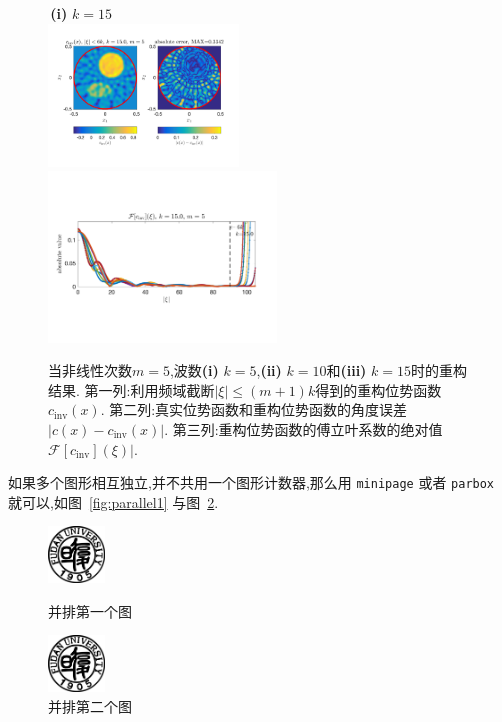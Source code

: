 \documentclass[a4paper,punct=banjiao,twoside]{ctexrep}
\theoremstyle{plain}
\theoremstyle{definition}
\theoremstyle{remark}
\begin{document}
\begin{figure}[H]
\,\hfill \textbf{(i)} $k = 15$ \hfill\,\\
\includegraphics[width=0.45\textwidth,trim=20 60 20 35,clip]{./figs/pwc_5_Ic_0150.png}
\includegraphics[width=0.54\textwidth,trim=10 60 30 90,clip]{./figs/pwc_5_Fc_0150.png}\\
\caption[算法2:不连续位势的重构结果]{当非线性次数$m=5$,波数\textbf{(i)} $k = 5$,\textbf{(ii)} $k = 10$和\textbf{(iii)} $k = 15$时的重构结果.
第一列:利用频域截断$|\xi| \leq (m+1)k$得到的重构位势函数$c_{\textrm{inv}}(x)$.
第二列:真实位势函数和重构位势函数的角度误差$|c(x) - c_{\textrm{inv}}(x)|$.
第三列:重构位势函数的傅立叶系数的绝对值$\mathcal{F}[c_{\textrm{inv}}](\xi)|$.
}
\label{fig:5_pwc}
\end{figure}

如果多个图形相互独立,并不共用一个图形计数器,那么用 \texttt{minipage} 或者
\texttt{parbox} 就可以,如图~\ref{fig:parallel1} 与图~\ref{fig:parallel2}.

\begin{figure}[H]
  \centering
  \begin{minipage}{0.48\textwidth}
    \centering
    \includegraphics[height=1.5cm]{./figs/fudan-emblem.pdf}
    \caption{并排第一个图}
    \label{fig:parallel1}
  \end{minipage}\hfill
  \begin{minipage}{0.48\textwidth}
    \centering
    \includegraphics[height=1.5cm]{./figs/fudan-emblem.pdf}
    \caption{并排第二个图}
    \label{fig:parallel2}
  \end{minipage}
\end{figure}
\end{document}
